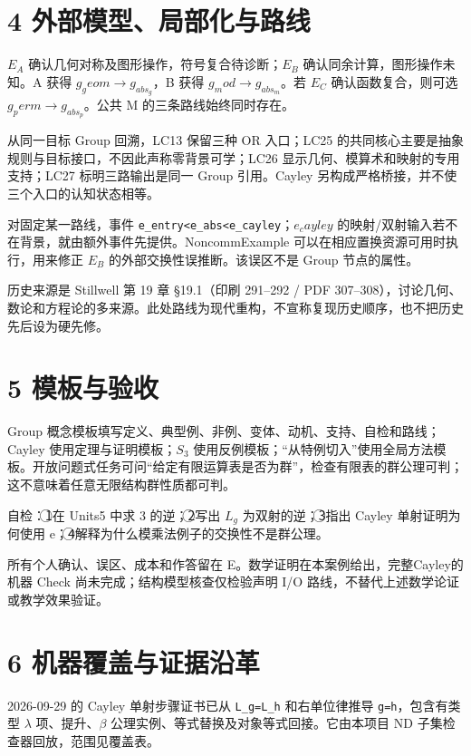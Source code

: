 \documentclass[UTF8,a4paper,zihao=-4,fontset=windows,openany]{ctexbook}
\newcommand{\mcsnum}[1]{\textcircled{\scriptsize #1}}
\def\mathrm#1{#1}%
\newcommand{\mcsbrk}{\penalty 200\relax}
\begin{document}
\section{4 外部模型、局部化与路线}
\(E_A\) 确认几何对称及图形操作，符号复合待诊断；\(E_B\) 确认同余计算，图形操作未知。A 获得 \(g_\mathrm{geom}\to g_{\mathrm{abs}_g}\)，B 获得 \(g_\mathrm{mod}\to g_{\mathrm{abs}_m}\)。若 \(E_C\) 确认函数复合，则可选 \(g_\mathrm{perm}\to g_{\mathrm{abs}_p}\)。公共 M 的三条路线始终同时存在。

从同一目标 Group 回溯，LC13 保留三种 OR 入口；LC25 的共同核心主要是抽象规则与目标接口，不因此声称零背景可学；LC26 显示几何、模算术和映射的专用支持；LC27 标明三路输出是同一 Group 引用。Cayley 另构成严格桥接，并不使三个入口的认知状态相等。

对固定某一路线，事件 \texttt{e\mcsbrk\_entry<e\mcsbrk\_abs<e\mcsbrk\_cayley}；\(e_\mathrm{cayley}\) 的映射/双射输入若不在背景，就由额外事件先提供。NoncommExample 可以在相应置换资源可用时执行，用来修正 \(E_B\) 的外部交换性误推断。该误区不是 Group 节点的属性。

历史来源是 Stillwell 第 19 章 §19.1（印刷 291–292 / PDF 307–308），讨论几何、数论和方程论的多来源。此处路线为现代重构，不宣称复现历史顺序，也不把历史先后设为硬先修。

\section{5 模板与验收}
Group 概念模板填写定义、典型例、非例、变体、动机、支持、自检和路线；Cayley 使用定理与证明模板；\(S_{3}\) 使用反例模板；“从特例切入”使用全局方法模板。开放问题式任务可问“给定有限运算表是否为群”，检查有限表的群公理可判；这不意味着任意无限结构群性质都可判。

自检：\mcsnum{1}在 Units5 中求 3 的逆；\mcsnum{2}写出 \(L_g\) 为双射的逆；\mcsnum{3}指出 Cayley 单射证明为何使用 e；\mcsnum{4}解释为什么模乘法例子的交换性不是群公理。

所有个人确认、误区、成本和作答留在 E。数学证明在本案例给出，完整Cayley的机器 Check 尚未完成；结构模型核查仅检验声明 I/O 路线，不替代上述数学论证或教学效果验证。

\section{6 机器覆盖与证据沿革}
2026-09-29 的 Cayley 单射步骤证书已从 \texttt{L\mcsbrk\_g=L\mcsbrk\_h} 和右单位律推导 \texttt{g=h}，包含有类型 \(\lambda\) 项、提升、\(\beta\) 公理实例、等式替换及对象等式回接。它由本项目 ND 子集检查器回放，范围见覆盖表。
\end{document}
